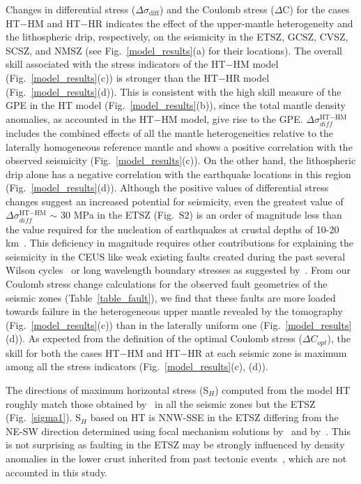 \documentclass[draft,linenumbers]{agujournal2018}
\begin{document}
Changes in differential stress ($\Delta \sigma_{\text{diff}}$) and the Coulomb stress ($\Delta$C) for the cases HT$-$HM and HT$-$HR indicates the effect of the upper-mantle heterogeneity and the lithospheric drip, respectively, on the seismicity in the ETSZ, GCSZ, CVSZ, SCSZ, and NMSZ (see Fig.~\ref{model_results}(a) for their locations). The overall skill associated with the stress indicators of the HT$-$HM model (Fig.~\ref{model_results}(c)) is stronger than the HT$-$HR model (Fig.~\ref{model_results}(d)). This is consistent with the high skill measure of the GPE in the HT model (Fig.~\ref{model_results}(b)), since the total mantle density anomalies, as accounted in the HT$-$HM model, give rise to the GPE.  $\Delta\sigma_{diff}^{\text{HT}-\text{HM}}$ includes the combined effects of all the mantle heterogeneities relative to the laterally homogeneous reference mantle and shows a positive correlation with the observed seismicity  (Fig.~\ref{model_results}(c)). On the other hand, the lithospheric drip alone has a negative correlation with the earthquake locations in this region (Fig.~\ref{model_results}(d)). Although the positive values of differential stress changes suggest an increased potential for seismicity, even the greatest value of $\Delta\sigma_{diff}^{\text{HT}-\text{HM}}$ $\sim$ 30 MPa in the ETSZ (Fig.~S2) is an order of magnitude less than the value required for the nucleation of earthquakes at crustal depths of 10-20 km~\citep[e.g.][]{sibson1990rupture}. This deficiency in magnitude requires other contributions for explaining the seismicity in the CEUS like weak existing faults created during the past several Wilson cycles~\citep{thomas2006tectonic} or long wavelength boundary stresses as suggested by~\citet{ghosh2019role}. From our Coulomb stress change calculations for the observed fault geometries of the seismic zones (Table~\ref{table_fault}), we find that these faults are more loaded towards failure in the heterogeneous upper mantle revealed by the tomography (Fig.~\ref{model_results}(c))  than in the laterally uniform one (Fig.~\ref{model_results}(d)). As expected from the definition of the optimal Coulomb stress ($\Delta C_{opt}$), the skill for both the cases HT$-$HM and HT$-$HR at each seismic zone is maximum among all the stress indicators (Fig.~\ref{model_results}(c), (d)). 

       
%
The directions of maximum horizontal stress (S$_H$) computed from the model HT  roughly match those obtained by~\citet{levandowski2018updated} in all the seismic zones but the ETSZ (Fig.~\ref{sigma1}).  S$_{H}$ based on HT is NNW-SSE in the ETSZ differing from the NE-SW direction determined using focal mechanism solutions by~\citet{levandowski2018updated} and by~\citet{mazzotti2010state}. This is not surprising as faulting in the ETSZ may be strongly influenced by density anomalies in the lower crust inherited from past tectonic events~\citep{levandowski2018updated}, which are not accounted in this study.
\end{document}
